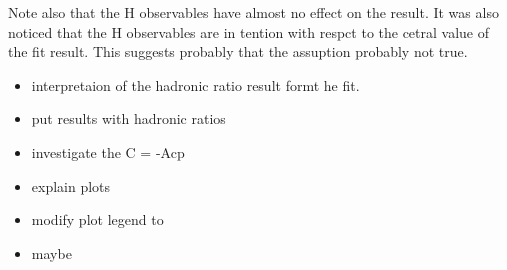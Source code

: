 Note also that the H observables have almost no effect on the result.
It was also noticed that the H observables are in tention with respct to the cetral value of the fit result.
This suggests probably that the assuption \equref{} probably not true.

\begin{itemize}
  \item interpretaion of the hadronic ratio result formt he fit.
  \item put results with hadronic ratios
  \item investigate the C = -Acp
  \item explain plots
  \item modify plot legend to
  \item maybe
\end{itemize}

